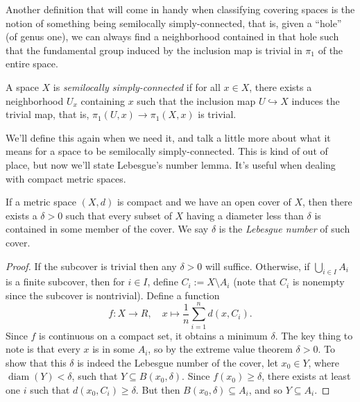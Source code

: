 Another definition that will come in handy when classifying covering spaces is the notion of something being semilocally simply-connected, that is, given a ``hole'' (of genus one), we can always find a neighborhood contained in that hole such that the fundamental group induced by the inclusion map is trivial in $\pi_1$ of the entire space.
\begin{definition}
    A space $X$ is \emph{semilocally simply-connected}  if for all $x\in X$, there exists a neighborhood $U_x$ containing $x$ such that the inclusion map $U \hookrightarrow X$ induces the trivial map, that is, $\pi_1(U,x)\to \pi_1(X,x)$ is trivial.
\end{definition}
We'll define this again when we need it, and talk a little more about what it means for a space to be semilocally simply-connected.
\orbreak
This is kind of out of place, but now we'll state Lebesgue's number lemma. It's useful when dealing with compact metric spaces.
\begin{lemma}
    If a metric space $(X,d)$ is compact and we have an open cover of $X$, then there exists a $\delta>0$ such that every subset of $X$ having a diameter less than $\delta$ is contained in some member of the cover. We say $\delta$ is the \emph{Lebesgue number} of such cover.
\end{lemma}
\begin{proof}
    If the subcover is trivial then any $\delta>0$ will suffice. Otherwise, if $\bigcup_{i \in  I} A_i$ is a finite subcover, then for $i\in I$, define $C_i :=X\setminus A_i$ (note that $C_i$ is nonempty since the subcover is nontrivial). Define a function \[
        f \colon X \to R,\quad x \mapsto \frac{1}{n} \sum_{i=1}^{n} d(x,C_i).
    \] Since $f$ is continuous on a compact set, it obtains a minimum $\delta$. The key thing to note is that every $x$ is in some $A_i$, so by the extreme value theorem $\delta >0$. To show that this $\delta$ is indeed the Lebesgue number of the cover, let $x_0\in Y$, where $\operatorname{diam}(Y)<\delta$, such that $Y\subseteq B(x_0,\delta)$. Since $f(x_0)\geq \delta$, there exists at least one $i$ such that $d(x_0,C_i)\geq \delta$. But then $B(x_0,\delta)\subseteq A_i$, and so $Y\subseteq A_i$.
\end{proof}


